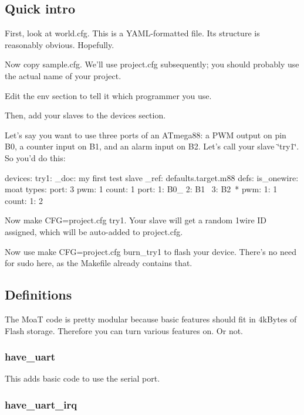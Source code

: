 \subsection*{Quick intro}

First, look at {\ttfamily world.\-cfg}. This is a Y\-A\-M\-L-\/formatted file. Its structure is reasonably obvious. Hopefully.

Now copy {\ttfamily sample.\-cfg}. We'll use {\ttfamily project.\-cfg} subsequently; you should probably use the actual name of your project.

Edit the {\ttfamily env} section to tell it which programmer you use.

Then, add your slaves to the {\ttfamily devices} section.

Let's say you want to use three ports of an A\-Tmega88\-: a P\-W\-M output on pin B0, a counter input on B1, and an alarm input on B2. Let's call your slave \char`\"{}try1\char`\"{}. So you'd do this\-: \begin{DoxyVerb}devices:
  try1:
    _doc: my first test slave
    _ref: defaults.target.m88
    defs:
      is_onewire: moat
    types:
      port: 3
      pwm: 1
      count: 1
    port:
      1: B0_
      2: B1~
      3: B2~*
    pwm:
      1: 1
    count:
      1: 2
\end{DoxyVerb}


Now {\ttfamily make C\-F\-G=project.\-cfg try1}. Your slave will get a random 1wire I\-D assigned, which will be auto-\/added to {\ttfamily project.\-cfg}.

Now use {\ttfamily make C\-F\-G=project.\-cfg burn\-\_\-try1} to flash your device. There's no need for {\ttfamily sudo} here, as the Makefile already contains that.

\subsection*{Definitions}

The {\ttfamily Moa\-T} code is pretty modular because basic features should fit in 4k\-Bytes of Flash storage. Therefore you can turn various features on. Or not.

\subsubsection*{{\ttfamily have\-\_\-uart}}

This adds basic code to use the serial port.

\subsubsection*{{\ttfamily have\-\_\-uart\-\_\-irq}}

